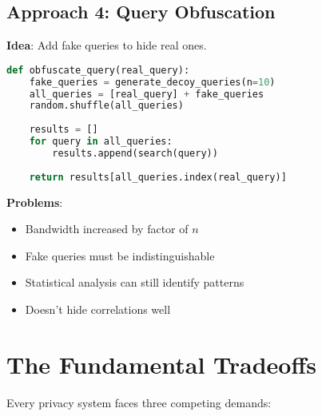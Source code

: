 \subsection{Approach 4: Query Obfuscation}

\textbf{Idea}: Add fake queries to hide real ones.

\begin{lstlisting}[language=Python]
def obfuscate_query(real_query):
    fake_queries = generate_decoy_queries(n=10)
    all_queries = [real_query] + fake_queries
    random.shuffle(all_queries)
    
    results = []
    for query in all_queries:
        results.append(search(query))
    
    return results[all_queries.index(real_query)]
\end{lstlisting}

\textbf{Problems}:
\begin{itemize}
\item Bandwidth increased by factor of $n$
\item Fake queries must be indistinguishable
\item Statistical analysis can still identify patterns
\item Doesn't hide correlations well
\end{itemize}

\section{The Fundamental Tradeoffs}

Every privacy system faces three competing demands:

\begin{center}
\end{center}

